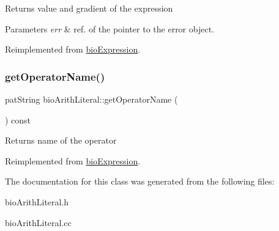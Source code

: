 \begin{DoxyReturn}{Returns}
value and gradient of the expression 
\end{DoxyReturn}

\begin{DoxyParams}{Parameters}
{\em err} & ref. of the pointer to the error object. \\
\hline
\end{DoxyParams}


Reimplemented from \hyperlink{classbio_expression_a91c81ce80c9e972c913b10f5f3c1ed13}{bio\+Expression}.

\mbox{\label{classbio_arith_literal_a0cdf0cb347fbf2b6db50b31ef8824d9c}} 
\subsubsection{\texorpdfstring{get\+Operator\+Name()}{getOperatorName()}}
{\footnotesize\ttfamily pat\+String bio\+Arith\+Literal\+::get\+Operator\+Name (\begin{DoxyParamCaption}{ }\end{DoxyParamCaption}) const\hspace{0.3cm}{\ttfamily [virtual]}}

\begin{DoxyReturn}{Returns}
name of the operator 
\end{DoxyReturn}


Reimplemented from \hyperlink{classbio_expression_a2353a4afb3a2b0af7c63aba086a72bde}{bio\+Expression}.



The documentation for this class was generated from the following files\+:\begin{DoxyCompactItemize}
\item 
bio\+Arith\+Literal.\+h\item 
bio\+Arith\+Literal.\+cc\end{DoxyCompactItemize}
